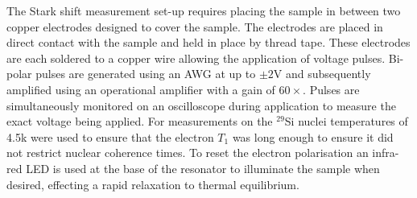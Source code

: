 The Stark shift measurement set-up requires placing the sample in between two copper electrodes designed to cover the sample.
The electrodes are placed in direct contact with the sample and held in place by thread tape.
These electrodes are each soldered to a copper wire allowing the application of voltage pulses.
Bi-polar pulses are generated using an AWG at up to $\pm2$V and subsequently amplified using an operational amplifier with a gain of $60\times$.
Pulses are simultaneously monitored on an oscilloscope during application to measure the exact voltage being applied.
For measurements on the $^{29}$Si nuclei temperatures of 4.5k were used to ensure that the electron $T_1$ was long enough to ensure it did not restrict nuclear coherence times.
To reset the electron polarisation an infra-red LED is used at the base of the resonator to illuminate the sample when desired, effecting a rapid relaxation to thermal equilibrium.


